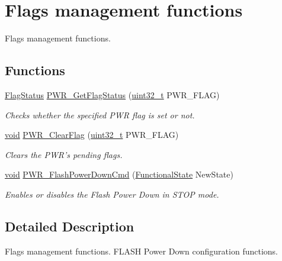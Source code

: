 \hypertarget{group___p_w_r___group5}{\section{Flags management functions}
\label{group___p_w_r___group5}
}


Flags management functions.  


\subsection*{Functions}
\begin{DoxyCompactItemize}
\item 
\hyperlink{group___exported__types_ga89136caac2e14c55151f527ac02daaff}{Flag\-Status} \hyperlink{group___p_w_r___group5_gaa980163a4d83304280ee34942464b4ec}{P\-W\-R\-\_\-\-Get\-Flag\-Status} (\hyperlink{stdint_8h_a435d1572bf3f880d55459d9805097f62}{uint32\-\_\-t} P\-W\-R\-\_\-\-F\-L\-A\-G)
\begin{DoxyCompactList}\small\item\em Checks whether the specified P\-W\-R flag is set or not. \end{DoxyCompactList}\item 
\hyperlink{group___n_a_m_e_ga18028b8badbf1ea7e704ccac3c488e82}{void} \hyperlink{group___p_w_r___group5_ga01c4b2fbd16514b993324e101c3ddf7c}{P\-W\-R\-\_\-\-Clear\-Flag} (\hyperlink{stdint_8h_a435d1572bf3f880d55459d9805097f62}{uint32\-\_\-t} P\-W\-R\-\_\-\-F\-L\-A\-G)
\begin{DoxyCompactList}\small\item\em Clears the P\-W\-R's pending flags. \end{DoxyCompactList}\item 
\hyperlink{group___n_a_m_e_ga18028b8badbf1ea7e704ccac3c488e82}{void} \hyperlink{group___p_w_r___group5_gaf0af19a9fdf0324f2ada60c9bce1aab5}{P\-W\-R\-\_\-\-Flash\-Power\-Down\-Cmd} (\hyperlink{group___exported__types_gac9a7e9a35d2513ec15c3b537aaa4fba1}{Functional\-State} New\-State)
\begin{DoxyCompactList}\small\item\em Enables or disables the Flash Power Down in S\-T\-O\-P mode. \end{DoxyCompactList}\end{DoxyCompactItemize}


\subsection{Detailed Description}
Flags management functions. F\-L\-A\-S\-H Power Down configuration functions.

